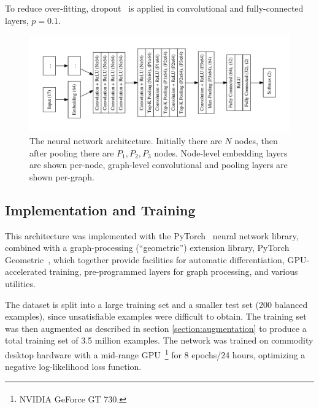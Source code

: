 \documentclass[runningheads]{llncs}
\begin{document}
To reduce over-fitting, dropout~\cite{dropout} is applied in convolutional and fully-connected layers, \(p = 0.1\).

\begin{figure}
	\centering
	\includegraphics[width=\linewidth]{network}
	\caption{The neural network architecture. Initially there are \(N\) nodes, then after pooling there are \(P_1, P_2, P_3\) nodes. Node-level embedding layers are shown per-node, graph-level convolutional and pooling layers are shown per-graph.}
	\label{figure:network}
\end{figure}

\subsection{Implementation and Training}
This architecture was implemented with the PyTorch~\cite{pytorch} neural network library, combined with a graph-processing (``geometric'') extension library, PyTorch Geometric~\cite{pytorch-geometric}, which together provide facilities for automatic differentiation, GPU-accelerated training, pre-programmed layers for graph processing, and various utilities.

The dataset is split into a large training set and a smaller test set (200 balanced examples), since unsatisfiable examples were difficult to obtain.
The training set was then augmented as described in section \ref{section:augmentation} to produce a total training set of 3.5 million examples.
The network was trained on commodity desktop hardware with a mid-range GPU~\footnote{NVIDIA\textsuperscript{\textregistered} GeForce\textsuperscript{\textregistered} GT 730.} for 8 epochs/24 hours, optimizing a negative log-likelihood loss function.
\end{document}
